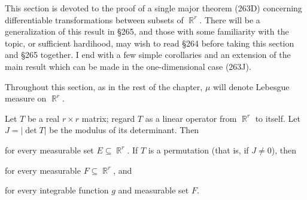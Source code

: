 
\def\diam{\mathop{\text{diam}}}
\def\dist{\mathop{\text{dist}}}

\def\chaptername{Change of variable in the integral}
\def\sectionname{Differentiable transformations in $\BbbR^r$}


\def\headlinesectionname{Differentiable transformations in
$\eightBbb R^r$}

This section is devoted to the proof of a single major theorem
(263D) concerning differentiable transformations between subsets of
$\BbbR^r$.   There will be a generalization of this result in \S265,
and those with some familiarity with the topic, or sufficient hardihood,
may wish to read \S264 before taking this section and \S265
together.   I end with a few simple corollaries and an extension of the
main result which can be made in the one-dimensional case (263J).

Throughout this section, as in the rest of the chapter, $\mu$ will
denote Lebesgue measure on $\BbbR^r$.

 Let $T$ be a real $r\times r$ matrix;  regard
$T$ as a
linear operator from $\BbbR^r$ to itself.   Let $J=|\det T|$ be the
modulus of its determinant.   Then


\noindent for every measurable set $E\subseteq\BbbR^r$.   If
$T$ is a permutation (that is, if $J\ne 0$), then


\noindent for every measurable $F\subseteq\BbbR^r$, and


\noindent for every integrable function $g$ and measurable set $F$.

